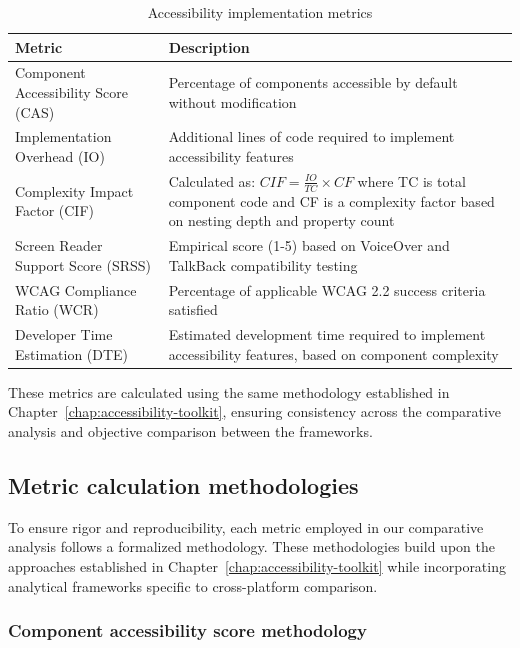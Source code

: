\begin{table}[ht]
\caption{Accessibility implementation metrics}
\label{tab:accessibility_metrics}
\centering
\begin{tabular}{|P{4cm}|P{10cm}|}
\hline
\textbf{Metric} & \textbf{Description} \\
\hline
Component Accessibility Score (CAS) & Percentage of components accessible by default without modification \\
\hline
Implementation Overhead (IO) & Additional lines of code required to implement accessibility features \\
\hline
Complexity Impact Factor (CIF) & Calculated as: $CIF = \frac{IO}{TC} \times CF$ where TC is total component code and CF is a complexity factor based on nesting depth and property count \\
\hline
Screen Reader Support Score (SRSS) & Empirical score (1-5) based on VoiceOver and TalkBack compatibility testing \\
\hline
WCAG Compliance Ratio (WCR) & Percentage of applicable WCAG 2.2 success criteria satisfied \\
\hline
Developer Time Estimation (DTE) & Estimated development time required to implement accessibility features, based on component complexity \\
\hline
\end{tabular}
\end{table}

These metrics are calculated using the same methodology established in Chapter~\ref{chap:accessibility-toolkit}, ensuring consistency across the comparative analysis and objective comparison between the frameworks.

\subsection{Metric calculation methodologies}
\label{subsec:metric-methodologies}

To ensure rigor and reproducibility, each metric employed in our comparative analysis follows a formalized methodology. These methodologies build upon the approaches established in Chapter~\ref{chap:accessibility-toolkit} while incorporating analytical frameworks specific to cross-platform comparison.

\subsubsection{Component accessibility score methodology}
\label{subsubsec:cas-methodology}

